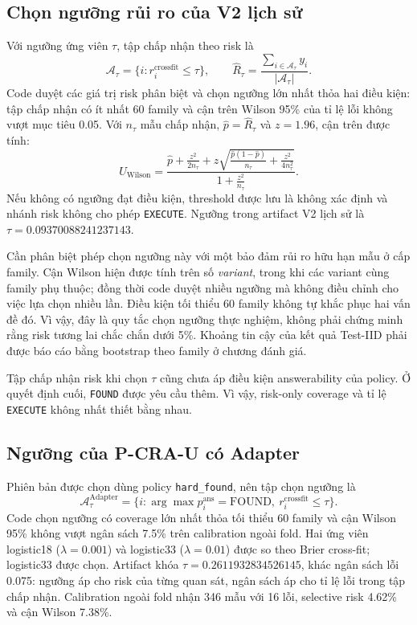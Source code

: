 \subsection{Chọn ngưỡng rủi ro của V2 lịch sử}

Với ngưỡng ứng viên $\tau$, tập chấp nhận theo risk là
\begin{equation}
    \mathcal{A}_{\tau}=
    \{i:r_i^{\mathrm{crossfit}}\leq\tau\},\qquad
    \widehat{R}_{\tau}=
    \frac{\sum_{i\in\mathcal{A}_{\tau}}y_i}
    {|\mathcal{A}_{\tau}|}.
\end{equation}
Code duyệt các giá trị risk phân biệt và chọn ngưỡng lớn nhất
thỏa hai điều kiện: tập chấp nhận có ít nhất 60 family và
cận trên Wilson 95\% của tỉ lệ lỗi không vượt mục tiêu 0.05.
Với $n_\tau$ mẫu chấp nhận, $\widehat{p}=\widehat{R}_{\tau}$
và $z=1.96$, cận trên được tính:
\begin{equation}
    U_{\mathrm{Wilson}}=
    \frac{\widehat{p}+\frac{z^2}{2n_\tau}
    +z\sqrt{\frac{\widehat{p}(1-\widehat{p})}{n_\tau}
    +\frac{z^2}{4n_\tau^2}}}
    {1+\frac{z^2}{n_\tau}}.
\end{equation}
Nếu không có ngưỡng đạt điều kiện, threshold được lưu là
không xác định và nhánh risk không cho phép \texttt{EXECUTE}.
Ngưỡng trong artifact V2 lịch sử là
$\tau=0.09370088241237143$.

Cần phân biệt phép chọn ngưỡng này với một bảo đảm rủi ro hữu
hạn mẫu ở cấp family. Cận Wilson hiện được tính trên số
\emph{variant}, trong khi các variant cùng family phụ thuộc;
đồng thời code duyệt nhiều ngưỡng mà không điều chỉnh cho việc
lựa chọn nhiều lần. Điều kiện tối thiểu 60 family không tự khắc
phục hai vấn đề đó. Vì vậy, đây là quy tắc chọn ngưỡng thực nghiệm,
không phải chứng minh rằng risk tương lai chắc chắn dưới 5\%.
Khoảng tin cậy của kết quả Test-IID phải được báo cáo bằng bootstrap
theo family ở chương đánh giá.

Tập chấp nhận risk khi chọn $\tau$ cũng chưa áp điều kiện
answerability của policy. Ở quyết định cuối, \texttt{FOUND}
được yêu cầu thêm. Vì vậy, risk-only coverage và tỉ lệ
\texttt{EXECUTE} không nhất thiết bằng nhau.

\subsection{Ngưỡng của P-CRA-U có Adapter}
\label{sec:method-adapter-threshold}

Phiên bản được chọn dùng policy \texttt{hard\_found}, nên tập chọn ngưỡng là
\begin{equation}
    \mathcal{A}^{\mathrm{Adapter}}_\tau=
    \{i:\arg\max p_i^{\mathrm{ans}}=\mathrm{FOUND},\ 
      r_i^{\mathrm{crossfit}}\leq\tau\}.
\end{equation}
Code chọn ngưỡng có coverage lớn nhất thỏa tối thiểu 60 family và
cận Wilson 95\% không vượt ngân sách 7.5\% trên calibration ngoài fold.
Hai ứng viên logistic18 ($\lambda=0.001$) và logistic33
($\lambda=0.01$) được so theo Brier cross-fit; logistic33 được chọn.
Artifact khóa $\tau=0.2611932834526145$, khác ngân sách lỗi 0.075:
ngưỡng áp cho risk của từng quan sát, ngân sách áp cho tỉ lệ lỗi
trong tập chấp nhận. Calibration ngoài fold nhận 346 mẫu với 16 lỗi,
selective risk 4.62\% và cận Wilson 7.38\%.

